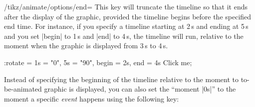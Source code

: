 \begin{key}{/tikz/animate/options/end=}
    This key will truncate the timeline so that it ends  after the
    display of the graphic, provided the timeline begins before the specified
    end time. For instance, if you specify a timeline starting at 2\,s and
    ending at 5\,s and you set |begin| to 1\,s and |end| to 4\,s, the timeline
    will run, relative to the moment when the graphic is displayed from 3\,s to
    4\,s.
\begin{codeexample}[imagesource={standalone/pgfmanual-en-tikz-animations-animation-57.svg}]
\tikz \node [fill = green!50!black, text = white]
    :rotate = { 1s = "0", 5s = "90", begin = 2s, end = 4s }
  {Click me};
\end{codeexample}
\end{key}

Instead of specifying the beginning of the timeline relative to the moment to
to-be-animated graphic is displayed, you can also set the ``moment |0s|'' to
the moment a specific \emph{event} happens using the following key:

